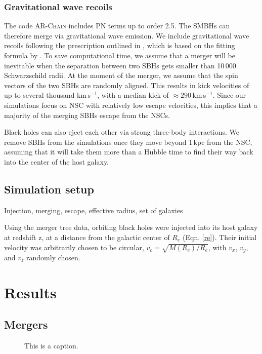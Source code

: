 \documentclass[english, apj]{emulateapj}
\begin{document}
\subsubsection{Gravitational wave recoils}
The code \textsc{AR-Chain} includes PN terms up to order 2.5. The SMBHs can therefore merge via gravitational wave emission. We include gravitational wave recoils following the prescription outlined in \citet{2015ApJ...799..178K}, which is based on the fitting formula by \citet{2012PhRvD..85h4015L}. To save computational time, we assume that a merger will be inevitable when the separation between two SBHs gets smaller than 10\,000 Schwarzschild radii. At the moment of the merger, we assume that the spin vectors of the two SBHs are randomly aligned. This results in kick velocities of up to several thousand km\,s$^{-1}$, with a median kick of $\approx 290$\,km\,s$^{-1}$. Since our simulations focus on NSC with relatively low escape velocities, this implies that a majority of the merging SBHs escape from the NSCs. 

Black holes can also eject each other via strong three-body interactions. We remove SBHs from the simulations once they move beyond 1\,kpc from the NSC, assuming that it will take them more than a Hubble time to find their way back into the center of the host galaxy.


\subsection{Simulation setup}
Injection, merging, escape, effective radius, set of galaxies

Using the merger tree data, orbiting black holes were injected into its host galaxy at redshift z, at a distance from the galactic center of $R_{e}$ (Eqn. \ref{re}).  Their initial velocity was arbitrarily chosen to be circular, $v_c = \sqrt{M(R_e)/R_e}$, with $v_x$, $v_y$, and $v_z$ randomly chosen.

\section{Results}\label{sec:results}

\subsection{Mergers}

\begin{figure}
\centering
\caption{This is a caption.}
\label{this_is_a_label}
\end{figure}
\end{document}
